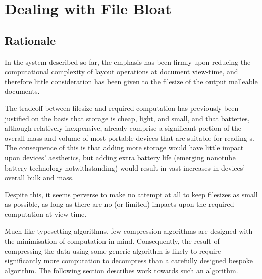 \chapter{Dealing with File Bloat}\label{ch:bloat}


\section{Rationale}
In the system described so far, the emphasis has been firmly upon reducing the computational complexity of layout operations at document view-time, and therefore little consideration has been given to the filesize of the output malleable documents.


The tradeoff between filesize and required computation has previously been justified on the basis that storage is cheap, light, and small, and that batteries, although relatively inexpensive, already comprise a significant portion of the overall mass and volume of most portable devices that are suitable for reading \ebook{}s. The consequence of this is that adding more storage would have little impact upon devices' aesthetics, but adding extra battery life (emerging nanotube battery technology notwithstanding) would result in vast increases in devices' overall bulk and mass.

Despite this, it seems perverse to make no attempt at all to keep filesizes as small as possible, as long as there are no (or limited) impacts upon the required computation at view-time.

Much like typesetting algorithms, few compression algorithms are designed with the minimisation of computation in mind. Consequently, the result of compressing the data using some generic algorithm is likely to require significantly more computation to decompress than a carefully designed bespoke algorithm. The following section describes work towards such an algorithm.


